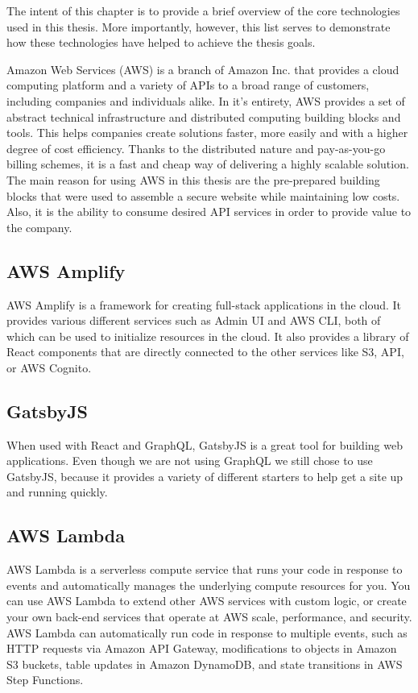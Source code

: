 \documentclass[12pt,oneside]{fithesis2}
\begin{document}
The intent of this chapter is to provide a brief overview of the core technologies used in this thesis. More importantly, however, this list serves to demonstrate how these technologies have helped to achieve the thesis goals.

Amazon Web Services (AWS) is a branch of Amazon Inc. that provides a cloud computing platform and a variety of APIs to a broad range of customers, including companies and individuals alike. In it's entirety, AWS provides a set of abstract technical infrastructure and distributed computing building blocks and tools. This helps companies create solutions faster, more easily and with a higher degree of cost efficiency. \cite{what-is-aws} Thanks to the distributed nature and pay-as-you-go billing schemes, it is a fast and cheap way of delivering a highly scalable solution. \cite{aws-pricing}
\newline\newline
The main reason for using AWS in this thesis are the pre-prepared building blocks that were used to assemble a secure website while maintaining low costs. Also, it is the ability to consume desired API services in order to provide value to the company.
\subsection*{AWS Amplify}
AWS Amplify is a framework for creating full-stack applications in the cloud. It provides various different services such as Admin UI and AWS CLI, both of which can be used to initialize resources in the cloud. It also provides a library of React components that are directly connected to the other services like S3, API, or AWS Cognito.
\subsection*{GatsbyJS}
When used with React and GraphQL, GatsbyJS is a great tool for building web applications. Even though we are not using GraphQL we still chose to use GatsbyJS, because it provides a variety of different starters to help get a site up and running quickly.
\subsection*{AWS Lambda}
AWS Lambda is a serverless compute service that runs your code in response to events and automatically manages the underlying compute resources for you. You can use AWS Lambda to extend other AWS services with custom logic, or create your own back-end services that operate at AWS scale, performance, and security. AWS Lambda can automatically run code in response to multiple events, such as HTTP requests via Amazon API Gateway, modifications to objects in Amazon S3 buckets, table updates in Amazon DynamoDB, and state transitions in AWS Step Functions.
\end{document}
